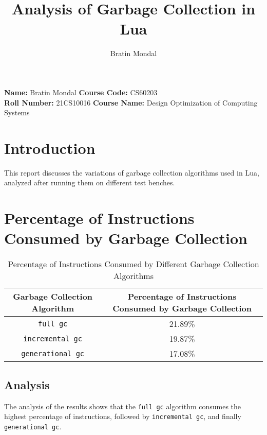 \documentclass[10pt]{article}
\title{Analysis of Garbage Collection in Lua}
\author{Bratin Mondal}
\begin{document}
\maketitle

\noindent

\begin{flushleft}
    \textbf{Name:} Bratin Mondal \hfill \textbf{Course Code:} CS60203 \\
    \textbf{Roll Number:} 21CS10016 \hfill \textbf{Course Name:} Design Optimization of Computing Systems
\end{flushleft}

\section{Introduction}
This report discusses the variations of garbage collection algorithms used in Lua, analyzed after running them on different test benches.

\section{Percentage of Instructions Consumed by Garbage Collection}
\begin{table}[h]
    \centering
    \begin{tabular}{|c|c|}
        \hline
        \textbf{Garbage Collection Algorithm} & \textbf{Percentage of Instructions Consumed by Garbage Collection} \\
        \hline
        \texttt{full gc} & 21.89\% \\
        \texttt{incremental gc} & 19.87\% \\
        \texttt{generational gc} & 17.08\% \\
        \hline
    \end{tabular}
    \caption{Percentage of Instructions Consumed by Different Garbage Collection Algorithms}
    \label{tab:percentage_instructions_gc}
\end{table}

\subsection{Analysis}
The analysis of the results shows that the \texttt{full gc} algorithm consumes the highest percentage of instructions, followed by \texttt{incremental gc}, and finally \texttt{generational gc}.
\end{document}
